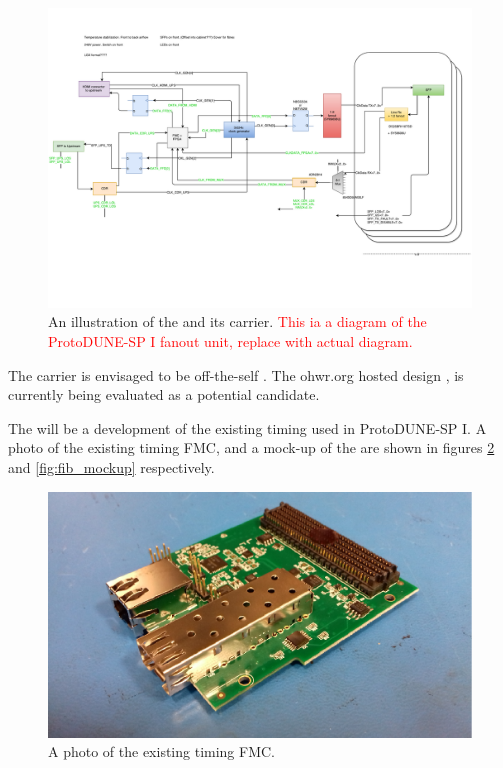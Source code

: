 \documentclass{article}
\begin{document}
\begin{figure}[h]
\includegraphics[width=\textwidth]{protoDUNE_timing_system_active_fanout.pdf}
\caption{An illustration of the  and its carrier. \textcolor{red}{This ia a diagram of the ProtoDUNE-SP I fanout unit, replace with actual diagram.}}
\label{fig:fib_and_carrier_layout}
\end{figure}

The  carrier is envisaged to be off-the-self . The ohwr.org hosted  design \cite{amc_ohwr}, is currently being evaluated as a potential candidate.

The  will be a development of the existing timing  used in ProtoDUNE-SP I. A photo of the existing timing FMC, and a mock-up of the  are shown in figures \ref{fig:timing_fmc} and \ref{fig:fib_mockup} respectively.

\begin{figure}[h]
\includegraphics[width=\textwidth]{timing_fmc.pdf}
\caption{A photo of the existing timing FMC.}
\label{fig:timing_fmc}
\end{figure}
\end{document}
